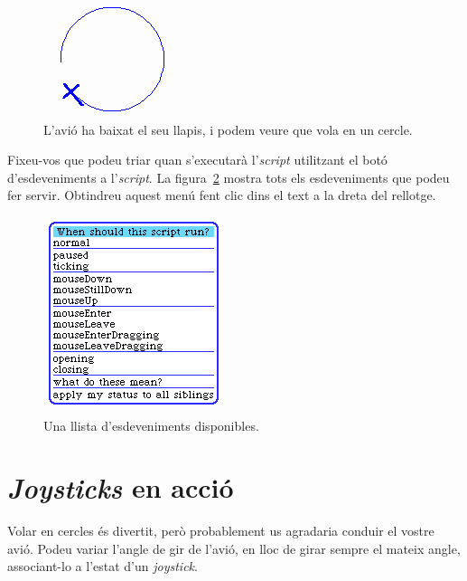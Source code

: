 \begin{figure}[h!]
\begin{center}
\includegraphics[scale=0.75]{Imatges/figura24-13}
\end{center}
\caption{L'avió ha baixat el seu llapis, i podem veure que vola en un cercle.}
\label{fig2413}
\end{figure}

Fixeu-vos que podeu triar quan s'executarà l'\emph{script} utilitzant el botó d'esdeveniments a l'\emph{script}. La figura~\ref{fig2414} mostra tots els esdeveniments que podeu fer servir. Obtindreu aquest menú fent clic dins el text a la dreta del rellotge.
\begin{figure}[h!]
\begin{center}
\includegraphics[scale=0.6]{Imatges/figura24-14}
\end{center}
\caption{Una llista d'esdeveniments disponibles.}
\label{fig2414}
\end{figure}

\section{\emph{Joysticks} en acció}
Volar en cercles és divertit, però probablement us agradaria conduir el vostre avió. Podeu variar l'angle de gir de l'avió, en lloc de girar sempre el mateix angle, associant-lo a l'estat d'un \emph{joystick}.

